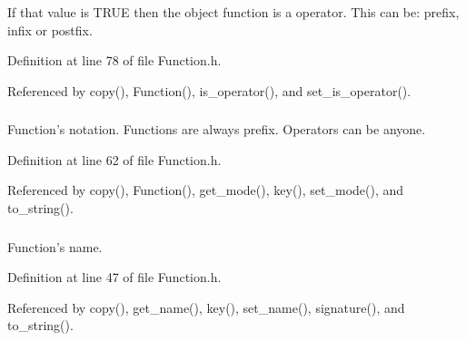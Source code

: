 If that value is TRUE then the object function is a operator. This can be: prefix, infix or postfix. 



Definition at line 78 of file Function.h.

Referenced by copy(), Function(), is\_\-operator(), and set\_\-is\_\-operator().\hypertarget{classgenevalmag_1_1Function_63645db8078f5c96b2c24d4873ee0fcd}{
\subsubsection[{f\_\-mod}]{}}
\label{classgenevalmag_1_1Function_63645db8078f5c96b2c24d4873ee0fcd}


Function's notation. Functions are always prefix. Operators can be anyone. 



Definition at line 62 of file Function.h.

Referenced by copy(), Function(), get\_\-mode(), key(), set\_\-mode(), and to\_\-string().\hypertarget{classgenevalmag_1_1Function_dab115bdcdc014b30b2b9c9e2da07109}{
\subsubsection[{f\_\-name}]{}}
\label{classgenevalmag_1_1Function_dab115bdcdc014b30b2b9c9e2da07109}


Function's name. 



Definition at line 47 of file Function.h.

Referenced by copy(), get\_\-name(), key(), set\_\-name(), signature(), and to\_\-string().\hypertarget{classgenevalmag_1_1Function_24cd8c438fe7af6c23d91a83587acce9}{
\subsubsection[{f\_\-prec}]{}}
\label{classgenevalmag_1_1Function_24cd8c438fe7af6c23d91a83587acce9}



